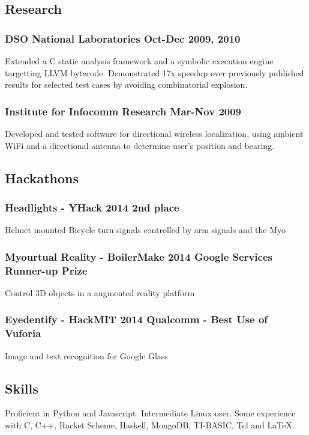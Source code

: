 \documentclass[letterpaper]{article}
\begin{document}
\vspace{1em}

\begin{center}
\section*{Research}
\end{center}

\subsubsection*{DSO National Laboratories \hfill Oct-Dec 2009, 2010}
Extended a C static analysis framework and a symbolic execution engine targetting LLVM bytecode. Demonstrated 17x speedup over previously published results for selected test cases by avoiding combinatorial explosion.

\subsubsection*{Institute for Infocomm Research \hfill Mar-Nov 2009}
Developed and tested software for directional wireless localization, using ambient WiFi and a directional antenna to determine user's position and bearing.

\vspace{1em}

\begin{center}
\section*{Hackathons}
\end{center}

\subsubsection*{Headlights - YHack 2014 \hfill 2nd place}

Helmet mounted Bicycle turn signals controlled by arm signals and the Myo

\subsubsection*{Myourtual Reality - BoilerMake 2014 \hfill Google Services Runner-up Prize}

Control 3D objects in a augmented reality platform

\subsubsection*{Eyedentify - HackMIT 2014 \hfill Qualcomm - Best Use of Vuforia}

Image and text recognition for Google Glass

\vspace{1em}

\begin{center}
\section*{Skills}
\end{center}
Proficient in Python and Javascript. Intermediate Linux user. Some experience with C, C++, Racket Scheme, Haskell, MongoDB, TI-BASIC, Tcl and LaTeX.
\end{document}
